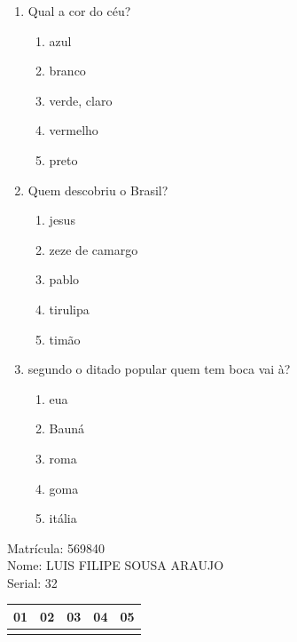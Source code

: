 \documentclass[10pt,a4paper,twocolumn]{report}
\begin{document}
 \begin{enumerate} 
    \item  Qual a cor do céu?





    \begin{enumerate}
    \item  azul

\item  branco

\item  verde, claro

\item  vermelho

\item  preto


    \end{enumerate} 
    \item  Quem descobriu o Brasil?





    \begin{enumerate}
    \item  jesus

\item  zeze de camargo

\item  pablo

\item  tirulipa

\item  timão


    \end{enumerate} 
    \item  segundo o ditado popular quem tem boca vai à?





    \begin{enumerate}
    \item  eua

\item  Bauná

\item  roma

\item  goma

\item  itália


    \end{enumerate}\end{enumerate} 
Matrícula: 569840\\ Nome: LUIS FILIPE SOUSA ARAUJO \\ Serial: 32\\
\begin{tabular}{|l|l|l|l|l|}\hline
01  &02  &03  &04  &05 \\ \hline 
 & & & & \\ \hline 
\end{tabular}
 \cleardoublepage 
\end{document}
